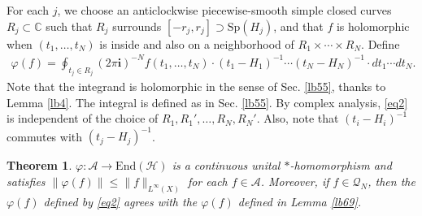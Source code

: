 \documentclass[12pt,b5paper,notitlepage]{article}
\theoremstyle{definition}
\theoremstyle{plain}
\newtheorem{thm}[df]{Theorem}
\newcommand{\mc}{\mathcal}
\newcommand{\End}{\mathrm{End}} %
\newcommand{\im}{\mathbf{i}}
\newcommand{\Cbb}{\mathbb C}
\newcommand{\Sp}{\mathrm{Sp}}
\numberwithin{equation}{section}
\begin{document}
For each $j$, we choose an anticlockwise piecewise-smooth simple closed curves $R_j\subset\Cbb$ such that $R_j$ surrounds $[-r_j,r_j]\supset \Sp(H_j)$,  and that $ f$ is holomorphic when $(t_1,\dots,t_N)$ is inside and also on a neighborhood of $R_1\times  \cdots\times R_N$. Define
\begin{align}
\varphi( f)=\oint_{t_j\in R_j}(2\pi\im)^{-N} f(t_1,\dots,t_N)\cdot(t_1-H_1)^{-1}\cdots(t_N-H_N)^{-1}\cdot dt_1\cdots dt_N.	\label{eq2}
\end{align}
Note that the integrand is holomorphic in the sense of Sec. \ref{lb55}, thanks to Lemma \ref{lb4}. The integral is defined as in Sec. \ref{lb55}. By complex analysis,  \eqref{eq2} is independent of the choice of $R_1,R_1',\dots,R_N,R_N'$. Also, note that $(t_i-H_i)^{-1}$ commutes with $(t_j-H_j)^{-1}$.



\begin{thm}\label{lb2}
$\varphi:\mc A\rightarrow\End(\mc H)$ is a continuous unital $*$-homomorphism and satisfies $\lVert\varphi( f)\lVert\leq \lVert  f\lVert_{L^\infty(X)}$ for each $ f\in\mc A$.  Moreover, if $f\in\mc Q_N$, then the $\varphi( f)$ defined by \eqref{eq2} agrees with the $\varphi(f)$ defined in Lemma \ref{lb69}. 
\end{thm}
\end{document}
